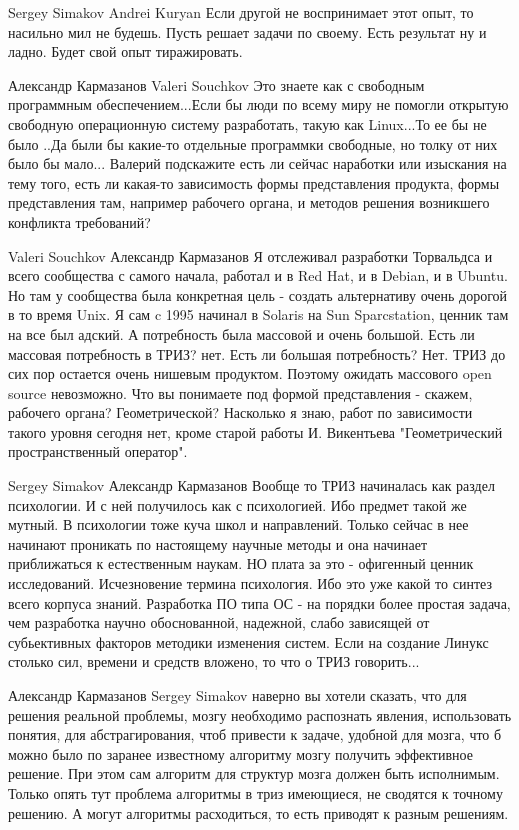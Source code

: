 \documentclass[11pt,a4paper]{article}
\begin{document}
Sergey Simakov Andrei Kuryan Если другой не воспринимает этот опыт, то
насильно мил не будешь. Пусть решает задачи по своему. Есть результат ну и
ладно. Будет свой опыт тиражировать.

Александр Кармазанов Valeri Souchkov Это знаете как с свободным программным
обеспечением...Если бы люди по всему миру не помогли открытую свободную
операционную систему разработать, такую как Linux...То ее бы не было ..Да были
бы какие-то отдельные программки свободные, но толку от них было бы мало...
Валерий подскажите есть ли сейчас наработки или изыскания на тему того, есть
ли какая-то зависимость формы представления продукта, формы представления там,
например рабочего органа, и методов решения возникшего конфликта требований?

Valeri Souchkov Александр Кармазанов Я отслеживал разработки Торвальдса и
всего сообщества с самого начала, работал и в Red Hat, и в Debian, и в
Ubuntu. Но там у сообщества была конкретная цель - создать альтернативу очень
дорогой в то время Unix. Я сам c 1995 начинал в Solaris на Sun Sparcstation,
ценник там на все был адский. А потребность была массовой и очень большой.
Есть ли массовая потребность в ТРИЗ? нет. Есть ли большая потребность?  Нет.
ТРИЗ до сих пор остается очень нишевым продуктом. Поэтому ожидать массового
open source невозможно.  Что вы понимаете под формой представления - скажем,
рабочего органа? Геометрической? Насколько я знаю, работ по зависимости такого
уровня сегодня нет, кроме старой работы И. Викентьева "Геометрический
пространственный оператор".

Sergey Simakov Александр Кармазанов Вообще то ТРИЗ начиналась как раздел
психологии. И с ней получилось как с психологией. Ибо предмет такой же
мутный. В психологии тоже куча школ и направлений. Только сейчас в нее
начинают проникать по настоящему научные методы и она начинает приближаться к
естественным наукам. НО плата за это - офигенный ценник
исследований. Исчезновение термина психология. Ибо это уже какой то синтез
всего корпуса знаний.  Разработка ПО типа ОС - на порядки более простая
задача, чем разработка научно обоснованной, надежной, слабо зависящей от
субьективных факторов методики изменения систем. Если на создание Линукс
столько сил, времени и средств вложено, то что о ТРИЗ говорить...

Александр Кармазанов Sergey Simakov наверно вы хотели сказать, что для решения
реальной проблемы, мозгу необходимо распознать явления, использовать понятия,
для абстрагирования, чтоб привести к задаче, удобной для мозга, что б можно
было по заранее известному алгоритму мозгу получить эффективное решение. При
этом сам алгоритм для структур мозга должен быть исполнимым. Только опять тут
проблема алгоритмы в триз имеющиеся, не сводятся к точному решению. А могут
алгоритмы расходиться, то есть приводят к разным решениям.
\end{document}
